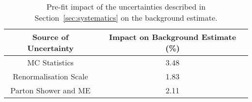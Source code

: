 \documentclass[NOTE, atlasdraft=true, texlive=2017, UKenglish]{\ATLASLATEXPATH atlasdoc}
\begin{document}
\begin{table}[!htbp]{\footnotesize\renewcommand{\arraystretch}{1.2}
  \begin{center}
    \footnotesize
    \begin{tabular}{|c|c|}
      \hline
      Source of Uncertainty & Impact on Background Estimate (\%) \\
      \hline
      MC Statistics & 3.48 \\
      Renormalisation Scale & 1.83 \\
      Parton Shower and ME & 2.11 \\
      \hline
    \end{tabular}
  \caption{Pre-fit impact of the uncertainties described in Section~\ref{sec:systematics} on the background estimate.}
  \label{tab:prefitbkgdsys}
  \end{center}}
\end{table}
\end{document}
